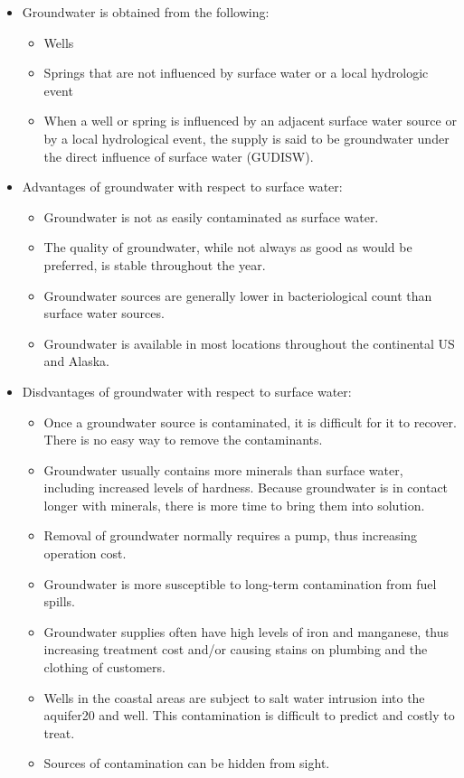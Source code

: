 \begin{itemize}
\begin{enumerate}
\begin{itemize}
\item Groundwater is obtained from the following:\\
\begin{itemize}
\item Wells
\item Springs that are not influenced by surface water or a local hydrologic event
\item When a well or spring is influenced by an adjacent surface water source or by a local hydrological event, the supply is said to be groundwater under the direct influence of surface water (GUDISW).
\end{itemize}
\item Advantages of groundwater with respect to surface water:\\
\begin{itemize}
\item Groundwater is not as easily contaminated as surface water.
\item The quality of groundwater, while not always as good as would be preferred, is stable throughout the year.
\item Groundwater sources are generally lower in bacteriological count than surface water sources.
\item Groundwater is available in most locations throughout the continental US and Alaska.
\end{itemize}
\item Disdvantages of groundwater with respect to surface water:\\
\begin{itemize}
\item Once a groundwater source is contaminated, it is difficult for it to recover. There is no easy way to remove the contaminants.
\item Groundwater usually contains more minerals than surface water, including increased levels of hardness. Because groundwater is in contact longer with minerals, there is more time to bring them into solution.
\item Removal of groundwater normally requires a pump, thus increasing operation cost.
\item Groundwater is more susceptible to long-term contamination from fuel spills.
\item Groundwater supplies often have high levels of iron and manganese, thus increasing treatment cost and/or causing stains on plumbing and the clothing of customers.
\item Wells in the coastal areas are subject to salt water intrusion into the aquifer20
and well. This contamination is difficult to predict and costly to treat.
\item Sources of contamination can be hidden from sight.
\end{itemize}
\end{itemize}


\end{enumerate}
\end{itemize}
